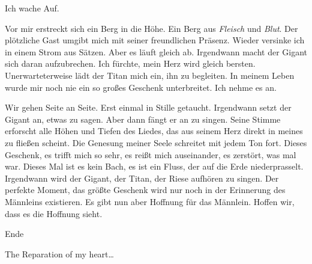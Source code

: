 \documentclass{article}
\begin{document}
	Ich wache Auf.
	
	Vor mir erstreckt sich ein Berg in die Höhe. Ein Berg aus \textit{Fleisch} und \textit{Blut}. Der plötzliche Gast umgibt mich mit seiner freundlichen Präsenz. Wieder versinke ich in einem Strom aus Sätzen. Aber es läuft gleich ab. Irgendwann macht der Gigant sich daran aufzubrechen. Ich fürchte, mein Herz wird gleich bersten. Unerwarteterweise lädt der Titan mich ein, ihn zu begleiten. In meinem Leben wurde mir noch nie ein so großes Geschenk unterbreitet. Ich nehme es an.  
	
	Wir gehen Seite an Seite. Erst einmal in Stille getaucht. Irgendwann setzt der Gigant an, etwas zu sagen. Aber dann fängt er an zu singen. Seine Stimme erforscht alle Höhen und Tiefen des Liedes, das aus seinem Herz direkt in meines zu fließen scheint. Die Genesung meiner Seele schreitet mit jedem Ton fort. Dieses Geschenk, es trifft mich so sehr, es reißt mich auseinander, es zerstört, was mal war. Dieses Mal ist es kein Bach, es ist ein Fluss, der auf die Erde niederprasselt. Irgendwann wird der Gigant, der Titan, der Riese aufhören zu singen. Der perfekte Moment, das größte Geschenk wird nur noch in der Erinnerung des Männleins existieren. Es gibt nun aber Hoffnung für das Männlein. Hoffen wir, dass es die Hoffnung sieht.
	
	Ende
	
	The Reparation of my heart…
\end{document}
